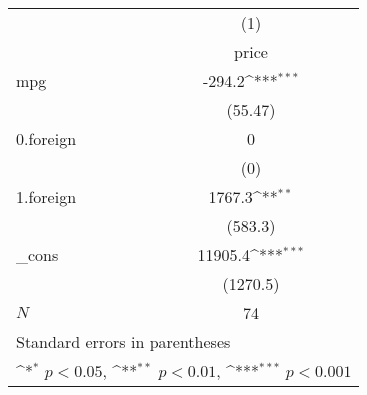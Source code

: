 {
\def\sym#1{\ifmmode^{#1}\else\(^{#1}\)\fi}
\begin{tabular}{l*{1}{c}}
\hline\hline
            &\multicolumn{1}{c}{(1)}\\
            &\multicolumn{1}{c}{price}\\
\hline
mpg         &      -294.2\sym{***}\\
            &     (55.47)         \\
[1em]
0.foreign   &           0         \\
            &         (0)         \\
[1em]
1.foreign   &      1767.3\sym{**} \\
            &     (583.3)         \\
[1em]
\_cons      &     11905.4\sym{***}\\
            &    (1270.5)         \\
\hline
\(N\)       &          74         \\
\hline\hline
\multicolumn{2}{l}{\footnotesize Standard errors in parentheses}\\
\multicolumn{2}{l}{\footnotesize \sym{*} \(p<0.05\), \sym{**} \(p<0.01\), \sym{***} \(p<0.001\)}\\
\end{tabular}
}
